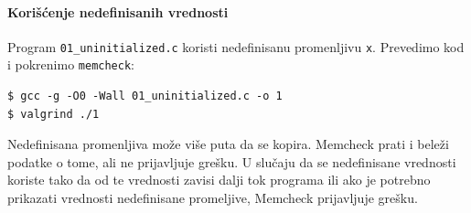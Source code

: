 \paragraph{Korišćenje nedefinisanih vrednosti}\label{koriux161ux107enje-nedefinisanih-vrednosti}

Program \texttt{01\_uninitialized.c} koristi nedefinisanu promenljivu \texttt{x}. Prevedimo kod i pokrenimo \texttt{memcheck}:

\begin{verbatim}
$ gcc -g -O0 -Wall 01_uninitialized.c -o 1
$ valgrind ./1
\end{verbatim}

Nedefinisana promenljiva može više puta da se kopira. Memcheck prati i beleži podatke o tome, ali ne prijavljuje grešku. U slučaju da se nedefinisane vrednosti koriste tako da od te vrednosti zavisi dalji tok programa ili ako je potrebno prikazati vrednosti nedefinisane promeljive, Memcheck prijavljuje grešku.

